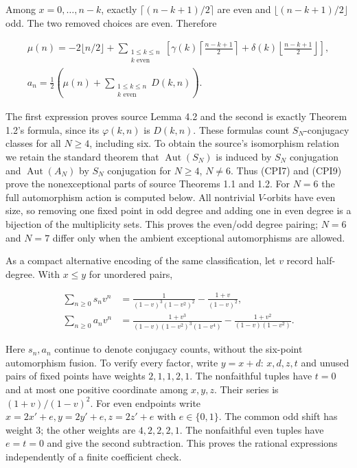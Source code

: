 \documentclass[
  11pt,
  a4paper,
]{article}
\newcounter{none} %
\begin{document}
Among \(x=0,\ldots,n-k\), exactly \(\lceil(n-k+1)/2\rceil\) are even and
\(\lfloor(n-k+1)/2\rfloor\) odd. The two removed choices are even.
Therefore

\[
 \begin{gathered}
 \mu(n)=-2\lfloor n/2\rfloor+
 \sum_{\substack{1\le k\le n\\k\text{ even}}}
 \left[\gamma(k)\left\lceil\frac{n-k+1}{2}\right\rceil+
 \delta(k)\left\lfloor\frac{n-k+1}{2}\right\rfloor\right],\\
 a_n=\frac12\left(\mu(n)+\sum_{\substack{1\le k\le n\\k\text{ even}}}D(k,n)\right).
 \end{gathered}
 \tag{CPI9}
\]

The first expression proves source Lemma 4.2 and the second is exactly
Theorem 1.2's formula, since its \(\varphi(k,n)\) is \(D(k,n)\). These
formulas count \(S_N\)-conjugacy classes for all \(N\ge4\), including
six. To obtain the source's isomorphism relation we retain the standard
theorem that \(\operatorname{Aut}(S_N)\) is induced by \(S_N\)
conjugation and \(\operatorname{Aut}(A_N)\) by \(S_N\) conjugation for
\(N\ge4\), \(N\ne6\). Thus (CPI7) and (CPI9) prove the nonexceptional
parts of source Theorems 1.1 and 1.2. For \(N=6\) the full automorphism
action is computed below. All nontrivial \(V\)-orbits have even size, so
removing one fixed point in odd degree and adding one in even degree is
a bijection of the multiplicity sets. This proves the even/odd degree
pairing; \(N=6\) and \(N=7\) differ only when the ambient exceptional
automorphisms are allowed.

As a compact alternative encoding of the same classification, let \(v\)
record half-degree. With \(x\le y\) for unordered pairs,

\[
 \begin{aligned}
 \sum_{n\ge0}s_nv^n&=\frac1{(1-v)^3(1-v^2)^2}-\frac{1+v}{(1-v)^2},\\
 \sum_{n\ge0}a_nv^n&=\frac{1+v^3}{(1-v)(1-v^2)^3(1-v^4)}-
 \frac{1+v^2}{(1-v)(1-v^2)}.
 \end{aligned}
 \tag{CPI10}
\]

Here \(s_n,a_n\) continue to denote conjugacy counts, without the
six-point automorphism fusion. To verify every factor, write \(y=x+d\):
\(x,d,z,t\) and unused pairs of fixed points have weights \(2,1,1,2,1\).
The nonfaithful tuples have \(t=0\) and at most one positive coordinate
among \(x,y,z\). Their series is \((1+v)/(1-v)^2\). For even endpoints
write \(x=2x'+e,y=2y'+e,z=2z'+e\) with \(e\in\{0,1\}\). The common odd
shift has weight 3; the other weights are \(4,2,2,2,1\). The nonfaithful
even tuples have \(e=t=0\) and give the second subtraction. This proves
the rational expressions independently of a finite coefficient check.
\end{document}
